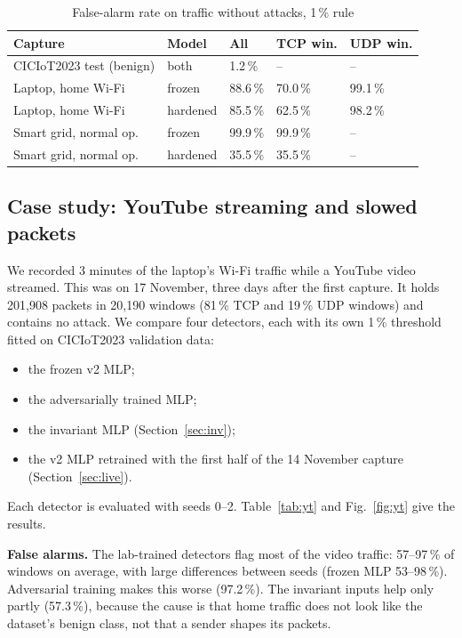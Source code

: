 \documentclass[conference]{IEEEtran}
\begin{document}
\begin{table}[t]
\caption{False-alarm rate on traffic without attacks, 1\,\% rule}\label{tab:live}
\centering\footnotesize
\setlength{\tabcolsep}{3pt}
\begin{tabular}{@{}lllll@{}}
\toprule
Capture & Model & All & TCP win. & UDP win. \\
\midrule
CICIoT2023 test (benign) & both & 1.2\,\% & -- & -- \\
Laptop, home Wi-Fi & frozen & 88.6\,\% & 70.0\,\% & 99.1\,\% \\
Laptop, home Wi-Fi & hardened & 85.5\,\% & 62.5\,\% & 98.2\,\% \\
Smart grid, normal op. & frozen & 99.9\,\% & 99.9\,\% & -- \\
Smart grid, normal op. & hardened & 35.5\,\% & 35.5\,\% & -- \\
\bottomrule
\end{tabular}
\end{table}

\subsection{Case study: YouTube streaming and slowed packets}\label{sec:yt}
We recorded 3 minutes of the laptop's Wi-Fi traffic while a YouTube video streamed. This was on 17 November, three days after the first capture. It holds 201,908 packets in 20,190 windows (81\,\% TCP and 19\,\% UDP windows) and contains no attack. We compare four detectors, each with its own 1\,\% threshold fitted on CICIoT2023 validation data:
\begin{itemize}
\item the frozen v2 MLP;
\item the adversarially trained MLP;
\item the invariant MLP (Section~\ref{sec:inv});
\item the v2 MLP retrained with the first half of the 14 November capture (Section~\ref{sec:live}).
\end{itemize}
Each detector is evaluated with seeds 0--2. Table~\ref{tab:yt} and Fig.~\ref{fig:yt} give the results.

\textbf{False alarms.} The lab-trained detectors flag most of the video traffic: 57--97\,\% of windows on average, with large differences between seeds (frozen MLP 53--98\,\%). Adversarial training makes this worse (97.2\,\%). The invariant inputs help only partly (57.3\,\%), because the cause is that home traffic does not look like the dataset's benign class, not that a sender shapes its packets.
\end{document}
